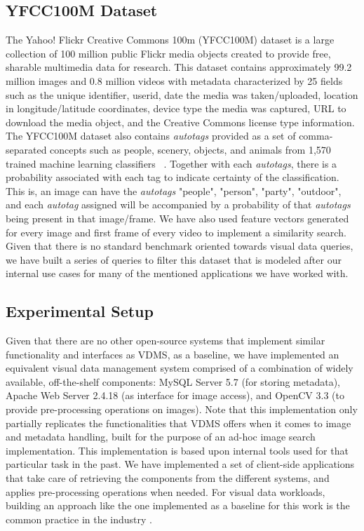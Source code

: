 \subsection{YFCC100M Dataset}
\label{dataset}

The Yahoo! Flickr Creative Commons 100m (YFCC100M) dataset is a large
collection of 100 million public Flickr media objects created to provide free,
sharable multimedia data for research. This dataset contains approximately
99.2 million images and 0.8 million videos with metadata characterized by
25 fields such as the unique identifier, userid,
date the media was taken/uploaded, location in longitude/latitude coordinates,
device type the media was captured, URL to download the media object,
and the Creative Commons license type information.
The YFCC100M dataset also contains \textit{autotags}
provided as a set of comma-separated concepts such as people, scenery, objects,
and animals from 1,570 trained machine learning classifiers ~\cite{Thomee_2016}.
Together with each \textit{autotags}, there is a
probability associated with each tag to indicate certainty of the classification.
This is, an image can have the \textit{autotags} "people", "person", "party",
"outdoor", and each \textit{autotag} assigned will be accompanied by a
probability of that \textit{autotags} being present in that image/frame.
We have also used feature vectors generated for every image and first frame
of every video \cite{features} to implement a similarity search.
Given that there is no standard benchmark oriented towards visual data queries,
we have built a series of queries to filter this dataset that is modeled after
our internal use cases for many of the mentioned applications we have worked
with.

\subsection{Experimental Setup}
\label{setup}

Given that there are no other open-source systems
that implement similar functionality and interfaces as VDMS, as a baseline,
we have implemented an equivalent visual data management system comprised of a
combination of widely available, off-the-shelf components:
MySQL Server 5.7 (for storing metadata),
Apache Web Server 2.4.18 (as interface for image access), and
OpenCV 3.3 (to provide pre-processing operations on images).
Note that this implementation only partially replicates the functionalities
that VDMS offers when it comes to image and metadata handling, built for the
purpose of an ad-hoc image search implementation.
This implementation is based upon internal tools used for
that particular task in the past.
We have implemented a set of client-side applications that take care
of retrieving the components from the different systems, and applies
pre-processing operations when needed.
For visual data workloads, building an approach like the one
implemented as a baseline for this work
is the common practice in the industry \cite{haystack, tao}.

